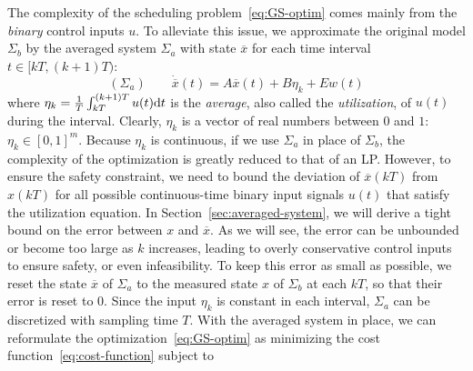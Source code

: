 The complexity of the %
scheduling problem~\eqref{eq:GS-optim} comes mainly from the \emph{binary} control inputs $u$.
To alleviate this issue, we %
approximate the original model $\Sigma_b$ by %
the averaged system $\Sigma_a$ with state $\overbar{x}$ for each time interval $t \in [kT, (k + 1) T)$:
\begin{equation*}
(\Sigma_a) \qquad \dot{\overbar{x}} (t) = A \overbar{x} (t) + B \eta_k + Ew (t) %
 \end{equation*}
where %
$\eta_k = \frac{1}{T} \int_{kT}^{(k + 1) T} u (t) \mathrm{d} t$ is the \emph{average}, also called the \emph{utilization}, of $u (t)$ during the interval. %
Clearly, $\eta_k$ is a vector of real numbers between $0$ and $1$: $\eta_k \in [0, 1]^m$.
Because %
$\eta_k$ %
is continuous, if we use $\Sigma_a$ in place of $\Sigma_b$, the complexity of the optimization is greatly reduced to that of an LP.
However, to ensure the safety constraint, we need to bound the deviation of $\overbar{x} (kT)$ from $x (kT)$ for all possible continuous-time binary input signals $u (t)$ that satisfy the utilization equation.
In Section~\ref{sec:averaged-system}, we will derive a tight bound on the error between $x$ and $\overbar{x}$.
As we will see, the error can be unbounded or become too large as $k$ increases, leading to overly conservative control inputs to ensure safety, or even infeasibility.
To keep this error as small as possible, we reset the state $\overbar{x}$ of $\Sigma_a$ to the measured state $x$ of $\Sigma_b$ at each $kT$, so that their error is reset to $0$.
Since the input $\eta_k$ is constant in each interval, $\Sigma_a$ can be discretized with sampling time $T$.
With the averaged system in place, we can reformulate the optimization~\eqref{eq:GS-optim} as minimizing the cost function~\eqref{eq:cost-function} subject to
